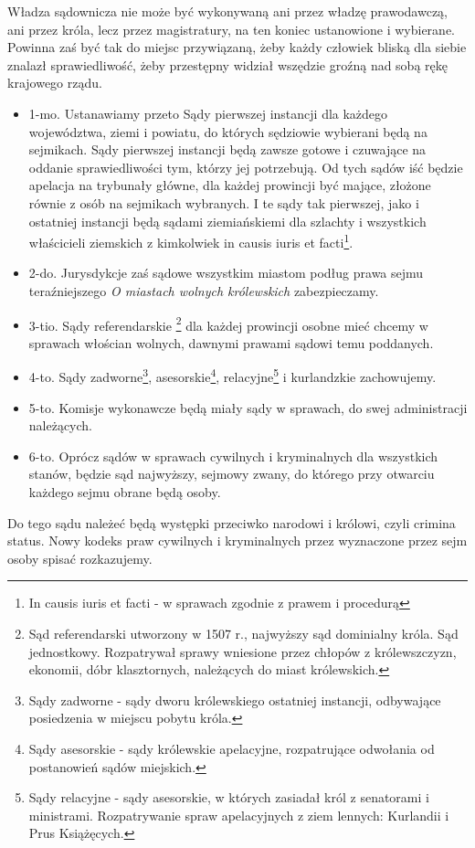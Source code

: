 \documentclass{book}
\begin{document}
 Władza sądownicza nie może być wykonywaną ani przez władzę prawodawczą, ani przez króla, lecz przez magistratury, na ten koniec ustanowione i wybierane. Powinna zaś być tak do miejsc przywiązaną, żeby każdy człowiek bliską dla siebie znalazł sprawiedliwość, żeby przestępny widział wszędzie groźną nad sobą rękę krajowego rządu.  
\begin{itemize}
\item 1-mo. Ustanawiamy przeto Sądy pierwszej instancji dla każdego województwa, ziemi i powiatu, do których sędziowie wybierani będą na sejmikach.  Sądy pierwszej instancji będą zawsze gotowe i czuwające na oddanie sprawiedliwości tym, którzy jej potrzebują.  Od tych sądów iść będzie apelacja na trybunały główne, dla każdej prowincji być mające, złożone równie z osób na sejmikach wybranych.  I te sądy tak pierwszej, jako i ostatniej instancji będą sądami ziemiańskiemi dla szlachty i wszystkich właścicieli ziemskich z kimkolwiek   in causis iuris et facti\footnote{In causis iuris et facti - w sprawach zgodnie z prawem i procedurą}. 
\item 2-do. Jurysdykcje zaś sądowe wszystkim miastom podług prawa sejmu teraźniejszego \textit{O miastach wolnych królewskich} zabezpieczamy. 
\item 3-tio. Sądy referendarskie \footnote{Sąd referendarski utworzony w 1507 r., najwyższy sąd dominialny króla.  Sąd jednostkowy. Rozpatrywał sprawy wniesione przez chłopów z królewszczyzn, ekonomii, dóbr klasztornych, należących do miast królewskich.} dla każdej prowincji osobne mieć chcemy w sprawach włościan wolnych, dawnymi prawami sądowi temu poddanych.  
\item 4-to. Sądy zadworne\footnote{Sądy zadworne - sądy dworu królewskiego ostatniej instancji, odbywające posiedzenia w miejscu pobytu króla.}, asesorskie\footnote{Sądy asesorskie - sądy królewskie apelacyjne, rozpatrujące odwołania od postanowień sądów miejskich.}, relacyjne\footnote{Sądy relacyjne - sądy asesorskie, w których zasiadał król z senatorami i ministrami. Rozpatrywanie spraw apelacyjnych z ziem lennych: Kurlandii i Prus Książęcych.} i kurlandzkie zachowujemy. 
\item 5-to. Komisje wykonawcze będą miały sądy w sprawach, do swej administracji należących.  
\item 6-to. Oprócz sądów w sprawach cywilnych i kryminalnych dla wszystkich stanów, będzie sąd najwyższy, sejmowy zwany, do którego przy otwarciu każdego sejmu obrane będą osoby. 
\end{itemize}
Do tego sądu należeć będą występki przeciwko narodowi i królowi, czyli crimina status. Nowy kodeks praw cywilnych i kryminalnych przez wyznaczone przez sejm osoby spisać rozkazujemy.  
\end{document}
